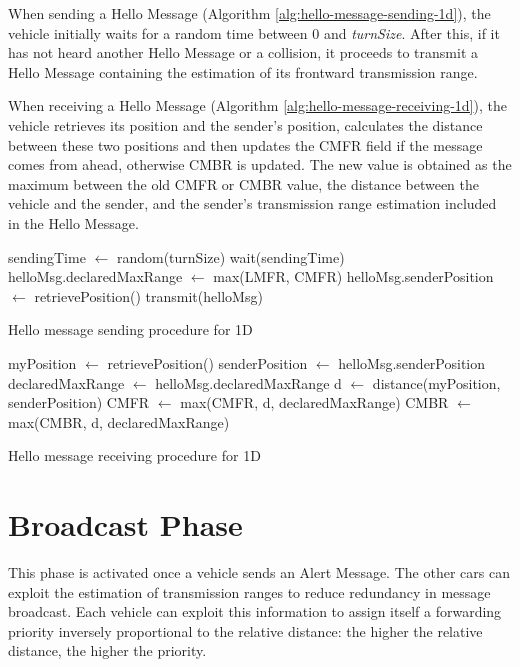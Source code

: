 		When sending a Hello Message (Algorithm \ref{alg:hello-message-sending-1d}), the vehicle initially waits for a random time between 0 and \textit{turnSize}. After this, if it has not heard another Hello Message or a collision, it proceeds to transmit a Hello Message containing the estimation of its frontward transmission range.
		
		
		When receiving a Hello Message (Algorithm \ref{alg:hello-message-receiving-1d}), the vehicle retrieves its position and the sender's position, calculates the distance between these two positions and then updates the CMFR field if the message comes from ahead, otherwise CMBR is updated. The new value is obtained as the maximum between the old CMFR or CMBR value, the distance between the vehicle and the sender, and the sender's transmission range estimation included in the Hello Message.
		
		\begin{algorithm}[H]
			\begin{algorithmic}[1]
					\State sendingTime $\gets$ random(turnSize)
					\State wait(sendingTime)
						\State helloMsg.declaredMaxRange $\gets$ max(LMFR, CMFR)
						\State helloMsg.senderPosition $\gets$ retrievePosition()
						\State transmit(helloMsg)
					\EndIf
				\EndFor
			\end{algorithmic}
			\caption{Hello message sending procedure for 1D}
			\label{alg:hello-message-sending-1d}
		\end{algorithm}
		
		\begin{algorithm}[H]
			\begin{algorithmic}[1]
				\State myPosition $\gets$ retrievePosition()
				\State senderPosition $\gets$ helloMsg.senderPosition
				\State declaredMaxRange $\gets$ helloMsg.declaredMaxRange
				\State d $\gets$ distance(myPosition, senderPosition)
				\State CMFR $\gets$ max(CMFR, d, declaredMaxRange)
				\Else
				\State CMBR $\gets$ max(CMBR, d, declaredMaxRange)
				\EndIf
			\end{algorithmic}
			\caption{Hello message receiving procedure for 1D}
			\label{alg:hello-message-receiving-1d}
		\end{algorithm}
	
	\section{Broadcast Phase}
		This phase is activated once a vehicle sends an Alert Message. The other cars can exploit the estimation of transmission ranges to reduce redundancy in message broadcast. Each vehicle can exploit this information to assign itself a forwarding priority inversely proportional to the relative distance: the higher the relative distance, the higher the priority.  
		
